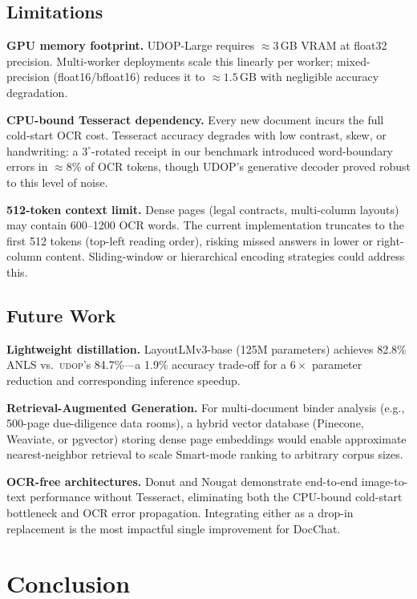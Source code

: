 \documentclass[conference]{IEEEtran}
\newcommand{\udop}{\textsc{udop}}
\begin{document}
\subsection{Limitations}

\textbf{GPU memory footprint.}
UDOP-Large requires ${\approx}3$\,GB VRAM at float32 precision. Multi-worker
deployments scale this linearly per worker; mixed-precision (float16/bfloat16)
reduces it to ${\approx}1.5$\,GB with negligible accuracy degradation.

\textbf{CPU-bound Tesseract dependency.}
Every new document incurs the full cold-start OCR cost. Tesseract accuracy
degrades with low contrast, skew, or handwriting: a $3^\circ$-rotated receipt
in our benchmark introduced word-boundary errors in ${\approx}$8\% of OCR
tokens, though UDOP's generative decoder proved robust to this level of noise.

\textbf{512-token context limit.}
Dense pages (legal contracts, multi-column layouts) may contain 600--1200 OCR
words. The current implementation truncates to the first 512 tokens
(top-left reading order), risking missed answers in lower or right-column
content. Sliding-window or hierarchical encoding strategies could address this.

\subsection{Future Work}

\textbf{Lightweight distillation.}
LayoutLMv3-base (125M parameters) achieves 82.8\% ANLS vs.\ \udop's 84.7\%---a
1.9\% accuracy trade-off for a $6\times$ parameter reduction and corresponding
inference speedup.

\textbf{Retrieval-Augmented Generation.}
For multi-document binder analysis (e.g., 500-page due-diligence data rooms),
a hybrid vector database (Pinecone, Weaviate, or pgvector) storing dense
page embeddings would enable approximate nearest-neighbor retrieval to
scale Smart-mode ranking to arbitrary corpus sizes.

\textbf{OCR-free architectures.}
Donut \cite{b_kim2022} and Nougat \cite{b_blecher2023} demonstrate
end-to-end image-to-text performance without Tesseract, eliminating both the
CPU-bound cold-start bottleneck and OCR error propagation. Integrating either
as a drop-in replacement is the most impactful single improvement for DocChat.

\section{Conclusion}
\label{sec:conclusion}
\end{document}
